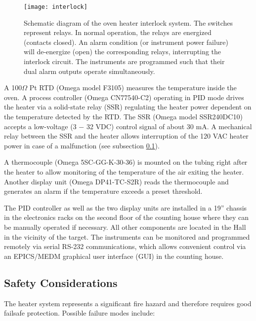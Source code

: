 {\begin{figure}
\begin{center}
\centerline{\texttt{[image: interlock]}}
\end{center}
\caption[Schematic diagram of the oven heater interlock system]%
{Schematic diagram of the oven heater interlock system.
The switches represent relays. 
In normal operation, the relays are energized (contacts closed). 
An alarm condition
(or instrument power failure) will de-energize (open)
 the corresponding relays,  interrupting the interlock circuit.
The instruments are programmed such that their dual alarm outputs
operate simultaneously.}
\label{fig:interlock}
\end{figure}


A 100$\Omega$ Pt RTD (Omega model F3105) measures the temperature
inside the oven. A process
controller (Omega CN77540-C2) operating in PID mode drives the
heater via a solid-state relay (SSR) regulating the heater power
dependent on the temperature detected by the RTD.
The SSR (Omega model SSR240DC10) accepts a low-voltage (3 $-$ 32 VDC)
control signal of about 30 mA. A mechanical relay between the SSR and
the heater allows interruption of the 120 VAC heater power in case of a 
malfunction (see subsection \ref{sec:heaterinterlock}).

A thermocouple (Omega 5SC-GG-K-30-36) is mounted on the
tubing right after the heater to allow monitoring of the temperature
of the air exiting the heater.  Another display unit (Omega
DP41-TC-S2R) reads the thermocouple and generates an alarm if the
temperature exceeds a preset threshold.

The PID controller as well as the two display units are installed
in a 19'' chassis in the electronics racks on the second floor of the
counting house where they can be manually operated if necessary.
All other components are located in the Hall in the vicinity of the
target. The instruments can be monitored
and programmed remotely via serial RS-232 communications, which
allows convenient control via an EPICS/MEDM graphical user interface 
(GUI) in the counting house.

\begin{safetyen}{10}{5}
\subsection{Safety Considerations}
\label{sec:heaterinterlock}

The heater system represents a significant fire hazard and therefore
requires good failsafe protection.
Possible failure modes include:
\begin{enumerate}


\end{enumerate}
\end{safetyen}}

